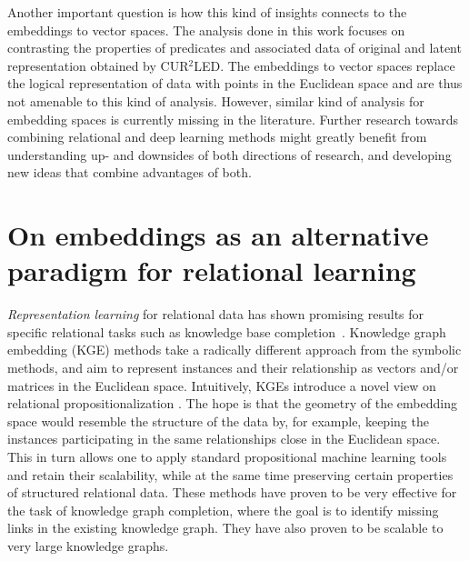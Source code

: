 Another important question is how this kind of insights connects to the embeddings to vector spaces.
The analysis done in this work focuses on contrasting the properties of predicates and associated data of original and latent representation obtained by CUR$^2$LED.
The embeddings to vector spaces replace the logical representation of data with points in the Euclidean space and are thus not amenable to this kind of analysis.
However, similar kind of analysis for embedding spaces is currently missing in the literature.
Further research towards combining relational and deep learning methods might greatly benefit from understanding up- and downsides of both directions of research, and developing new ideas that combine advantages of both.


\section{On embeddings as an alternative paradigm for relational learning}




\textit{Representation learning} for relational data has shown promising results for specific relational tasks such as knowledge base completion~\cite{Nickel0TG16}.
Knowledge graph embedding (KGE) methods take a radically different approach from the symbolic methods, and aim to represent instances and their relationship as vectors and/or matrices in the Euclidean space.
Intuitively, KGEs introduce a novel view on relational propositionalization \cite{Kramer2001}.
The hope is that the geometry of the embedding space would resemble the structure of the data by, for example, keeping the instances participating in the same relationships close in the Euclidean space.
This in turn allows one to apply standard propositional machine learning tools and retain their scalability, while at the same time preserving certain properties of structured relational data.
These methods have proven to be very effective for the task of knowledge graph completion, where the goal is to identify missing links in the existing knowledge graph. They have also proven to be scalable to very large knowledge graphs.


